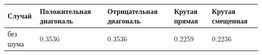 \begin{tabular}{|l|l|l|l|l|}
\hline
Случай & Положительная диагональ & Отрицательная диагональ & Крутая прямая & Крутая смещенная \\
\hline
без шума & 0.3536 & 0.3536 & 0.2259 & 0.2236 \\
\hline
\end{tabular}
